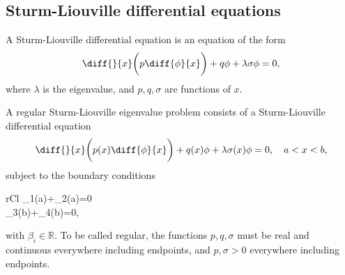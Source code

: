 \documentclass{article}
\begin{document}
\subsection{Sturm-Liouville differential equations}
\begin{definition}
	A Sturm-Liouville differential equation is an equation of the form
	\begin{equation*}
		\diff{}{x}\bigg(p\diff{\phi}{x}\bigg)+q\phi+\lambda\sigma\phi=0,
	\end{equation*}
	where \(\lambda\) is the eigenvalue, and \(p,q,\sigma\) are functions of \(x\).
\end{definition}
\begin{definition}
	A regular Sturm-Liouville eigenvalue problem consists of a Sturm-Liouville differential equation
	\begin{equation*}
		\diff{}{x}\bigg(p(x)\diff{\phi}{x}\bigg)+q(x)\phi+\lambda\sigma(x)\phi=0,
		\quad a<x<b,
	\end{equation*}
	subject to the boundary conditions
	\begin{IEEEeqnarray*}{rCl}
		\beta_1\phi(a)+\beta_2(a)=0\\
		\beta_3\phi(b)+\beta_4(b)=0,
	\end{IEEEeqnarray*}
	with \(\beta_i\in\mathbb{R}\). To be called regular, the functions \(p,q,\sigma\) must be real and continuous everywhere including endpoints, and \(p,\sigma>0\) everywhere including endpoints.
\end{definition}
\end{document}
